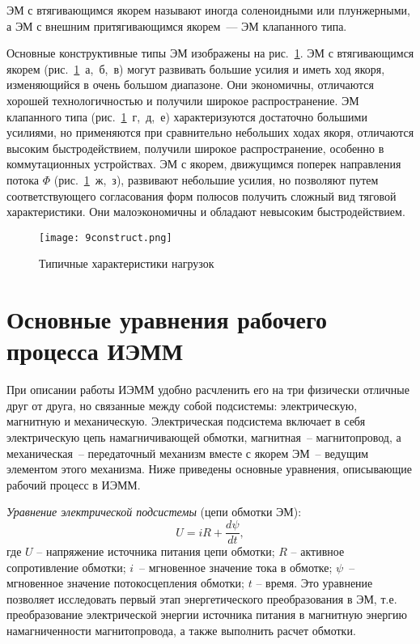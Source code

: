 ЭМ с втягивающимся якорем называют иногда соленоидными или плунжерными, а ЭМ с внешним притягивающимся якорем~--- ЭМ клапанного типа.

Основные конструктивные типы ЭМ изображены на рис.~\ref{pic:9construct}. ЭМ с втягивающимся якорем (рис.~\ref{pic:9construct}~а,~б,~в) могут развивать большие усилия и иметь ход якоря, изменяющийся в очень большом диапазоне. Они экономичны, отличаются  хорошей технологичностью и получили широкое распространение. ЭМ клапанного типа (рис.~\ref{pic:9construct}~г,~д,~е) характеризуются достаточно большими усилиями, но применяются при сравнительно небольших ходах якоря, отличаются высоким быстродействием, получили широкое распространение, особенно в коммутационных устройствах. ЭМ с якорем, движущимся поперек направления потока $ \Phi $ (рис.~\ref{pic:9construct}~ж,~з), развивают небольшие усилия, но позволяют путем соответствующего согласования форм полюсов получить сложный вид тяговой характеристики. Они малоэкономичны и обладают невысоким быстродействием.

\begin{figure}[h!]
	\caption{ Типичные характеристики нагрузок }
	\texttt{[image: 9construct.png]}
	\label{pic:9construct}
\end{figure}

\section{Основные уравнения рабочего процесса ИЭММ}

При описании работы ИЭММ удобно расчленить его на три физически отличные друг от друга, но связанные между собой подсистемы: электрическую, магнитную и механическую. Электрическая подсистема включает в себя электрическую цепь намагничивающей обмотки, магнитная~-- магнитопровод, а механическая~-- передаточный механизм вместе с якорем ЭМ~-- ведущим элементом этого механизма. Ниже приведены основные уравнения, описывающие рабочий процесс в ИЭММ.

\textit{Уравнение электрической подсистемы} (цепи обмотки ЭМ):
\[ U = iR + \dfrac{d\psi}{dt},\]
где $ U $ -- напряжение источника питания цепи обмотки; $ R $ -- активное сопротивление обмотки; $ i $~-- мгновенное значение тока в обмотке; $ \psi $~-- мгновенное значение потокосцепления обмотки; $ t $ -- время. Это уравнение позволяет исследовать первый этап энергетического преобразования в ЭМ, т.е. преобразование электрической энергии источника питания в магнитную энергию намагниченности магнитопровода, а также выполнить расчет обмотки.

